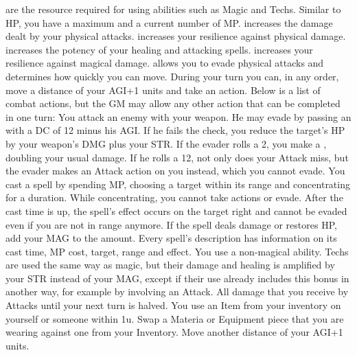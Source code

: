  are the resource required for using abilities such as Magic and Techs. Similar to HP, you have a maximum and a current number of MP. \ofrow
{} increases the damage dealt by your physical attacks. \ofrow
{} increases your resilience against physical damage. \ofrow
{} increases the potency of your healing and attacking spells. \ofrow
{} increases your resilience against magical damage. \ofrow
{} allows you to evade physical attacks and determines how quickly you can move.
%
\newpage
%
During your turn you can, in any order, move a distance of your AGI+1 units and take an action.
Below is a list of combat actions, but the GM may allow any other action that can be completed in one turn:\ofgap
%
You attack an enemy with your weapon. 
He may evade by passing an  with a DC of 12 minus his AGI. 
If he fails the check, you reduce the target's HP by your weapon's DMG plus your STR.
If the evader rolls a 2, you make a \mbox{}, doubling your usual damage. 
If he rolls a 12, not only does your Attack miss, but the evader makes an Attack action on you instead, which you cannot evade.\ofgap
%
You cast a spell by spending MP, choosing a target within its range and concentrating for a duration.
While concentrating, you cannot take actions or evade. 
After the cast time is up, the spell's effect occurs on the target right  and cannot be evaded even if you are not in range anymore.
If the spell deals damage or restores HP, add your MAG to the amount.
Every spell's description has information on its cast time, MP cost, target, range and effect.\ofgap
%
You use a non-magical ability. 
Techs are used the same way as magic, but their damage and healing is amplified by your STR instead of your MAG, 
except if their use already includes this bonus in another way, for example by involving an Attack.\ofgap
%
 All damage that you receive by Attacks until your next turn is halved. \ofgap
%
 You use an Item from your inventory on yourself or someone within 1u.\ofgap
%
 Swap a Materia or Equipment piece that you are wearing against one from your Inventory.\ofgap
%
 Move another distance of your AGI+1 units.\\\\

